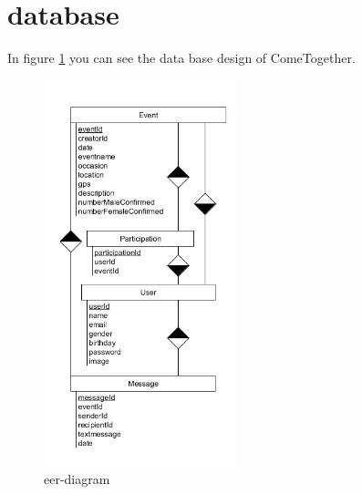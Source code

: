 \section{database}\label{database}
In figure \ref{fig:EERdiagram} you can see the data base design of ComeTogether.

\begin{figure}[htp]
\centering
\includegraphics[width=0.5\textwidth]{Ingo/pictures/EER-diagram.png}
\caption{eer-diagram}
\label{fig:EERdiagram}
\end{figure}
